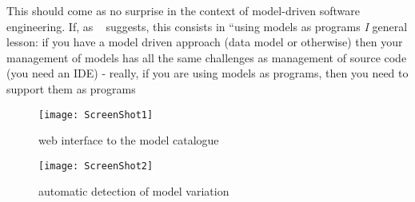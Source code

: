 This should come as no surprise in the context of model-driven
software engineering.  If, as ~\cite{Fowler} suggests, this
consists in ``using models as programs 
\textsl{I} general lesson: if you have a model driven approach (data model
  or otherwise) then your management of models has all the same
  challenges as management of source code (you need an IDE) - really,
  if you are using models as programs, then you need to support them
  as programs

\clearpage

\begin{figure*}[h]
  \centering
  \texttt{[image: ScreenShot1]}
  \caption{web interface to the model catalogue}
  \label{fig:webinterface}
\end{figure*}

\begin{figure*}[h]
  \centering
  \texttt{[image: ScreenShot2]}  
  \caption{automatic detection of model variation}
  \label{fig:variation}
\end{figure*}

